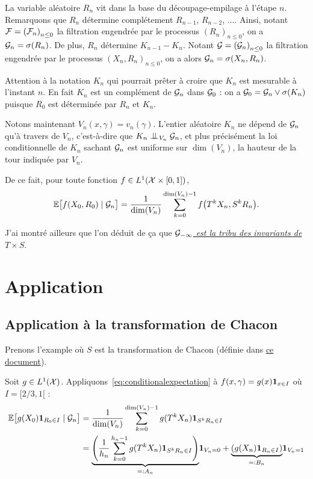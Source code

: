 \documentclass[12pt,a4paper]{article}
\begin{document}
La variable aléatoire $R_n$ vit dans la base du découpage-empilage 
à l'étape $n$. 
Remarquons que $R_n$ détermine complétement $R_{n-1}$, $R_{n-2}$, $\ldots$. 
Ainsi, notant $\mathcal{F}={(\mathcal{F}_n)}_{n \leq 0}$ la filtration engendrée 
par le processus ${(R_n)}_{n \leq 0}$, on a 
$\mathcal{G}_n = \sigma(R_n)$. 
 De plus, $R_n$ détermine $K_{n-1}-K_n$. 
Notant $\mathcal{G}={(\mathcal{G}_n)}_{n \leq 0}$ la filtration engendrée 
par le processus ${(X_n,R_n)}_{n \leq 0}$, on a alors
$\mathcal{G}_n = \sigma(X_n, R_n)$. 

Attention à la notation $K_n$ qui pourrait prêter à croire que 
$K_n$ est mesurable à l'instant $n$. 
En fait $K_n$ est un complément de $\mathcal{G}_n$ dans $\mathcal{G}_0$ : 
on a $\mathcal{G}_0 = \mathcal{G}_n \vee \sigma(K_n)$ puisque 
$R_0$ est déterminée par $R_n$ et $K_n$. 

Notons maintenant $V_n(x,\gamma)=v_n(\gamma)$. 
L'entier aléatoire $K_n$ ne dépend de $\mathcal{G}_n$ qu'à travers de 
$V_n$, c'est-à-dire que $K_n \indep_{V_n} \GG_n$, et 
plus précisément la loi conditionnelle de $K_n$ sachant $\mathcal{G}_n$ 
est uniforme sur $\dim(V_n)$, la hauteur de la tour indiquée par $V_n$. 

De ce fait, pour toute fonction $f \in L^1(\mathcal{X} \times [0,1])$, 
\begin{equation}\label{eq:conditionalexpectation}
\mathbb{E}\bigl[f(X_0, R_0) \mid \mathcal{G}_n\bigr]
 =\frac{1}{\dim(V_n)}\sum_{k=0}^{\dim(V_n)-1} f\bigl(T^kX_n, S^kR_n \bigr).
\end{equation}

J'ai montré ailleurs que l'on déduit de ça que 
\uline{\emph{$\mathcal{G}_{-\infty}$ est la tribu des invariants de $T \times S$}}. 


\section{Application} 

\subsection{Application à la transformation de Chacon}

Prenons l'example où $S$ est la transformation de Chacon 
(définie dans \href{https://cdr.lib.unc.edu/indexablecontent/uuid:bfc41b0c-b048-440f-9a57-533e02ea4f76}{ce document}). 

Soit $g \in L^1(\mathcal{X})$. 
Appliquons~\eqref{eq:conditionalexpectation} à 
$f(x,\gamma) = g(x)\boldsymbol 1_{x \in I}$ où $I=[2/3, 1[$ :
\begin{align*}
\mathbb{E}\bigl[g(X_0) \boldsymbol 1_{R_0 \in I} \mid \mathcal{G}_n\bigr]
&  = \frac{1}{\dim(V_n)}\sum_{k=0}^{\dim(V_n)-1} g(T^kX_n) \boldsymbol 1_{S^k R_n \in I} \\
& = \underset{=:A_n}{\underbrace{\left(\frac{1}{h_n}\sum_{k=0}^{h_n-1} g(T^kX_n) \boldsymbol 1_{S^k R_n \in I}\right)}}\boldsymbol 1_{V_n=0} 
+ \underset{=:B_n}{\underbrace{\left(g(X_n) \boldsymbol 1_{R_n \in I}\right)}}\boldsymbol 1_{V_n=1}
\end{align*}
\end{document}
